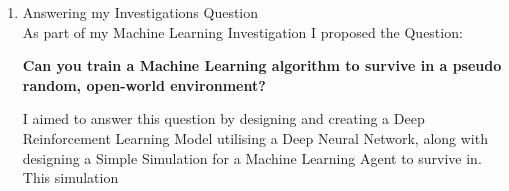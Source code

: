 \begin{flushleft}
\begin{enumerate}
\begin{enumerate}
                    \vspace{0.5cm}   
            \end{enumerate}

            \vspace{0.5cm}
        \item {\Large Answering my Investigations Question} \\
        \vspace{0.2cm}
        As part of my Machine Learning Investigation I proposed the Question:

        \vspace{0.3cm}\begin{center}
        \textbf{Can you train a Machine Learning algorithm to survive in a pseudo random, open-world environment?}
        \end{center}\vspace{0.3cm}

        I aimed to answer this question by designing and creating a Deep Reinforcement Learning Model utilising a Deep Neural Network, along 
        with designing a Simple Simulation for a Machine Learning Agent to survive in. This simulation

    \end{enumerate}
\end{flushleft}